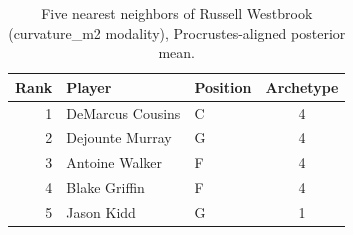 \begin{table}[htbp]
  \centering\small
  \begin{tabular}{rllc}
    \toprule
    Rank & Player & Position & Archetype \\
    \midrule
    1 & DeMarcus Cousins & C & 4 \\
    2 & Dejounte Murray & G & 4 \\
    3 & Antoine Walker & F & 4 \\
    4 & Blake Griffin & F & 4 \\
    5 & Jason Kidd & G & 1 \\
    \bottomrule
  \end{tabular}
  \caption{Five nearest neighbors of Russell Westbrook (curvature_m2 modality), Procrustes-aligned posterior mean.}
  \label{tab:Russell_Westbrook_neighbors_curvature_m2}
\end{table}

